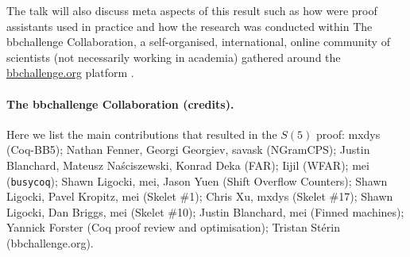 \documentclass{easychair}
\newcommand{\CoqBB}{Coq-BB5\xspace}
\theoremstyle{definition} %
\numberwithin{equation}{section}
\theoremstyle{definition} %
\begin{document}
The talk will also discuss meta aspects of this result such as how were proof assistants used in practice and how the research was conducted within The bbchallenge Collaboration, a self-organised, international, online community of scientists (not necessarily working in academia) gathered around the \url{bbchallenge.org} platform \cite{sterin_2022_14955828}.

\newpage




\newpage
\paragraph{The bbchallenge Collaboration (credits).} Here we list the main contributions that resulted in the $S(5)$ proof: mxdys (\CoqBB); Nathan Fenner, Georgi Georgiev, savask (NGramCPS); Justin Blanchard, Mateusz Naściszewski, Konrad Deka (FAR); Iijil (WFAR); mei (\texttt{busycoq}); Shawn Ligocki, mei, Jason Yuen (Shift Overflow Counters); Shawn Ligocki, Pavel Kropitz, mei (Skelet \#1); Chris Xu, mxdys (Skelet \#17); Shawn Ligocki, Dan Briggs, mei (Skelet \#10); Justin Blanchard, mei (Finned machines); Yannick Forster (Coq proof review and optimisation); Tristan Stérin (bbchallenge.org).

\end{document}
